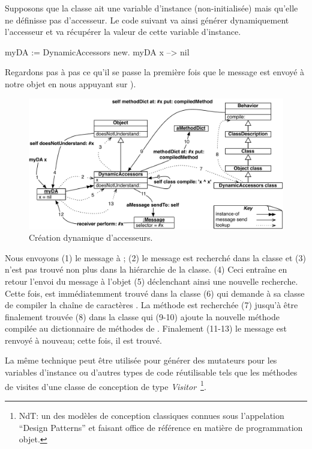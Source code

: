 \documentclass[a4paper,10pt,twoside]{book}
\begin{document}
Supposons que la classe  ait une variable d'instance
(non-initialisée)  mais qu'elle ne définisse pas d'accesseur.
Le code suivant va ainsi générer dynamiquement l'accesseur et va récupérer la valeur de cette variable d'instance.
\begin{code}{}
myDA := DynamicAccessors new.
myDA x --> nil
\end{code}

Regardons pas à pas ce qu'il se passe la première fois que le message 
 est envoyé à notre objet en nous appuyant sur ).

\begin{figure}[ht]\centering
	\includegraphics[width=\linewidth]{DynamicAccessors}
	\caption{Création dynamique d'accesseurs.}
\end{figure}

Nous envoyons (1) le message  à ; (2) le message est recherché dans la classe et (3) n'est pas trouvé non plus dans la hiérarchie de la classe. (4) Ceci entraîne en retour l'envoi du message  à l'objet (5) déclenchant ainsi une nouvelle recherche. Cette fois,  est immédiatemment trouvé dans la classe  (6) qui demande à sa classe de compiler la chaîne de caractères . La méthode  est recherchée (7) jusqu'à être finalement trouvée (8) dans la classe  qui (9-10) ajoute la nouvelle méthode compilée au dictionnaire de méthodes de . Finalement (11-13) le message est renvoyé à nouveau; cette fois, il est trouvé.

La même technique peut être utilisée pour générer des mutateurs pour les variables d'instance ou d'autres types de code réutilisable tels que les méthodes de visites d'une classe de conception de type \emph{Visitor}~\footnote{NdT: un des modèles de conception classiques connues sous l'appelation ``Design Patterns'' et faisant office de référence en matière de programmation objet.}.
\end{document}
